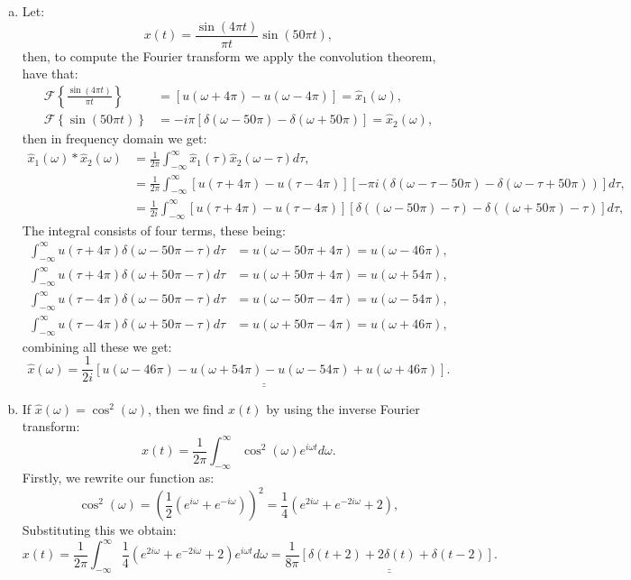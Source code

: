 \begin{enumerate}
\begin{enumerate}[a)]
\item Let:
$$x(t)=\frac{\sin(4\pi t)}{\pi t}\sin(50\pi t),$$
then, to compute the Fourier transform we apply the convolution theorem, have that:
\begin{align*}
    \mathcal{F}\left\{\frac{\sin(4\pi t)}{\pi t}\right\}&=[u(\omega+4\pi)-u(\omega-4\pi)]=\hat{x}_{1}(\omega), \\
    \mathcal{F}\left\{\sin(50\pi t)\right\}&=-i\pi[\delta(\omega-50\pi)-\delta(\omega+50\pi)]=\hat{x}_{2}(\omega),
\end{align*}
then in frequency domain we get:
\begin{align*}
\hat{x}_{1}(\omega)*\hat{x}_{2}(\omega)&=\frac{1}{2\pi}\int_{-\infty}^{\infty}\hat{x}_{1}(\tau)\hat{x}_{2}(\omega-\tau)d\tau, \\
&=\frac{1}{2\pi}\int_{-\infty}^{\infty}[u(\tau+4\pi)-u(\tau-4\pi)][-\pi i(\delta(\omega-\tau-50\pi)-\delta(\omega-\tau+50\pi))]d\tau, \\
&=\frac{1}{2i}\int_{-\infty}^{\infty}[u(\tau+4\pi)-u(\tau-4\pi)][\delta((\omega-50\pi)-\tau)-\delta((\omega+50\pi)-\tau)]d\tau,
\end{align*}
The integral consists of four terms, these being:
\begin{align*}
    \int_{-\infty}^{\infty}u(\tau+4\pi)\delta(\omega-50\pi-\tau)d\tau&=u(\omega-50\pi+4\pi)=u(\omega-46\pi), \\
    \int_{-\infty}^{\infty}u(\tau+4\pi)\delta(\omega+50\pi-\tau)d\tau&=u(\omega+50\pi+4\pi)=u(\omega+54\pi), \\
    \int_{-\infty}^{\infty}u(\tau-4\pi)\delta(\omega-50\pi-\tau)d\tau&=u(\omega-50\pi-4\pi)=u(\omega-54\pi), \\
    \int_{-\infty}^{\infty}u(\tau-4\pi)\delta(\omega+50\pi-\tau)d\tau&=u(\omega+50\pi-4\pi)=u(\omega+46\pi),
\end{align*}
combining all these we get:
$$\hat{x}(\omega)=\underline{\underline{\frac{1}{2i}[u(\omega-46\pi)-u(\omega+54\pi)-u(\omega-54\pi)+u(\omega+46\pi)]}}.$$

\item If $\hat{x}(\omega)=\cos^{2}(\omega)$, then we find $x(t)$ by using the inverse Fourier transform:
$$x(t)=\frac{1}{2\pi}\int_{-\infty}^{\infty}\cos^{2}(\omega)e^{i\omega t}d\omega.$$
Firstly, we rewrite our function as:
$$\cos^{2}(\omega)=\left(\frac{1}{2}\left(e^{i\omega}+e^{-i\omega}\right)\right)^{2}=\frac{1}{4}\left(e^{2i\omega }+e^{-2i\omega}+2\right),$$
Substituting this we obtain:
$$x(t)=\frac{1}{2\pi}\int_{-\infty}^{\infty}\frac{1}{4}\left(e^{2i\omega }+e^{-2i\omega}+2\right)e^{i\omega t}d\omega=\underline{\underline{\frac{1}{8\pi}[\delta(t+2)+2\delta(t)+\delta(t-2)]}}.$$
\end{enumerate}


\end{enumerate}
